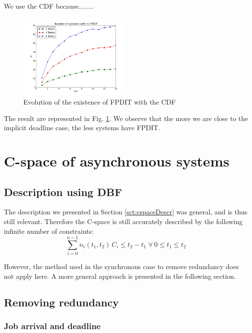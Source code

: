 \documentclass[times, 10pt,twocolumn, a4paper]{article}
\begin{document}
	We use the CDF because........\\

	\begin{figure}[h]
	\begin{center}
		\includegraphics[width=0.5\textwidth]{python-simulation/plots/nofpdit.png}
	\end{center}
	\caption{Evolution of the existence of FPDIT with the CDF}
	\label{fig:noFPDIT}
	\end{figure}

	The result are represented in Fig. \ref{fig:noFPDIT}. We observe that the more we are close to the implicit deadline case, the less systems have FPDIT.

\section{C-space of asynchronous systems}
  \label{sct:asyncCspace}

  \subsection{Description using DBF}

  The description we presented in Section \ref{sct:cspaceDescr} was general, and is thus still relevant. Therefore the C-space is still accurately described by the following infinite number of constraints:$$\sum_{i=0}^{n-1} n_i(t_1, t_2) \, C_i \leq t_2 - t_1 \; \forall \: 0 \leq t_1 \leq t_2$$

  However, the method used in the synchronous case to remove redundancy does not apply here. A more general approach is presented in the following section.

  \subsection{Removing redundancy}

\subsubsection{Job arrival and deadline}
\end{document}
